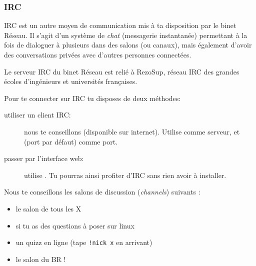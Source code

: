 
\subsubsection{IRC}

\label{irc}

IRC est un autre moyen de communication mis à ta disposition par le binet Réseau. Il s'agit d'un système de \emph{chat} (messagerie instantanée) permettant à la fois de dialoguer à plusieurs dans des salons (ou canaux), mais également d'avoir des conversations privées avec d'autres personnes connectées.


Le serveur IRC du binet Réseau est relié à RezoSup, réseau IRC des grandes écoles d'ingénieurs et universités françaises.

Pour te connecter sur IRC tu disposes de deux méthodes:



\begin{description}
\item[utiliser un client IRC:] nous te conseillons  (disponible sur internet). Utilise   comme serveur, et  (port par défaut) comme port.
  \item[passer par l'interface web:] utilise . Tu pourras ainsi profiter d'IRC sans rien avoir à  installer.
\end{description}

 
Nous te conseillons les salons de discussion (\emph{channels}) suivants :
\begin{itemize}
  \item {} le salon de tous les X
  \item {} si tu as des questions \`a poser sur linux
  \item {} un quizz en ligne (tape \texttt{!nick x} en arrivant)
  \item {} le salon du BR !
\end{itemize}

